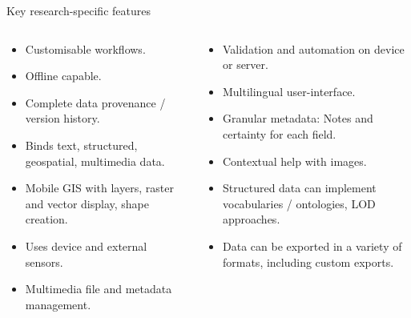 
\begin{frame}{Key research-specific features}
	\begin{columns}[T]
		\begin{column}{0.45\textwidth}
        \begin{itemize}
            \item Customisable workflows.
            \item Offline capable.
            \item Complete data provenance / version history.
            \item Binds text, structured, geospatial, multimedia data.
            \item Mobile GIS with layers, raster and vector display, shape creation.
            \item Uses device and external sensors. 
            \item Multimedia file and metadata management.
        \end{itemize}
    \end{column}
	\begin{column}{0.45\textwidth}
        \begin{itemize}
            \item Validation and automation on device or server.
            \item Multilingual user-interface.
            \item Granular metadata: Notes and certainty for each field.
            \item Contextual help with images.
            \item Structured data can implement vocabularies / ontologies, LOD approaches.
            \item Data can be exported in a variety of formats, including custom exports.
        \end{itemize}
    \end{column}
\end{columns}
\end{frame}

